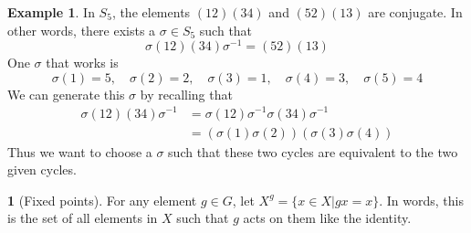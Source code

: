 \documentclass[12pt]{article}
\theoremstyle{definition}
\newtheorem{definition}{\color{NavyBlue}{\textbf{Definition}}}
\newtheorem{example}{\color{WildStrawberry}Example}
\theoremstyle{definition}
\begin{document}
\begin{example}
	In $S_5$, the elements $(1 2)(3 4)$ and $(5 2)(1 3)$ are conjugate. In other words, there exists a $\sigma \in S_5$ such that
	\begin{equation}
		\sigma (1 2)(3 4) \sigma^{-1} = (5 2)(1 3)
	\end{equation}
	One $\sigma$ that works is
	\begin{equation}
		\sigma(1)=5, \quad \sigma(2)=2, \quad \sigma(3)=1, \quad \sigma(4)=3, \quad \sigma(5)=4
	\end{equation}
	We can generate this $\sigma$ by recalling that
	\begin{align*}
	\sigma (1 2)(3 4) \sigma^{-1} &= \sigma (1 2) \sigma^{-1} \sigma (3 4) \sigma^{-1} \\
	&= (\sigma(1) \sigma(2))(\sigma(3) \sigma(4))
	\end{align*}
	Thus we want to choose a $\sigma$ such that these two cycles are equivalent to the two given cycles. 
\end{example}

\begin{definition}[Fixed points]
	For any element $g\in G$, let $X^g = \{x\in X|gx = x\}$. In words, this is the set of all elements in $X$ such that $g$ acts on them like the identity. 
\end{definition}
\end{document}
